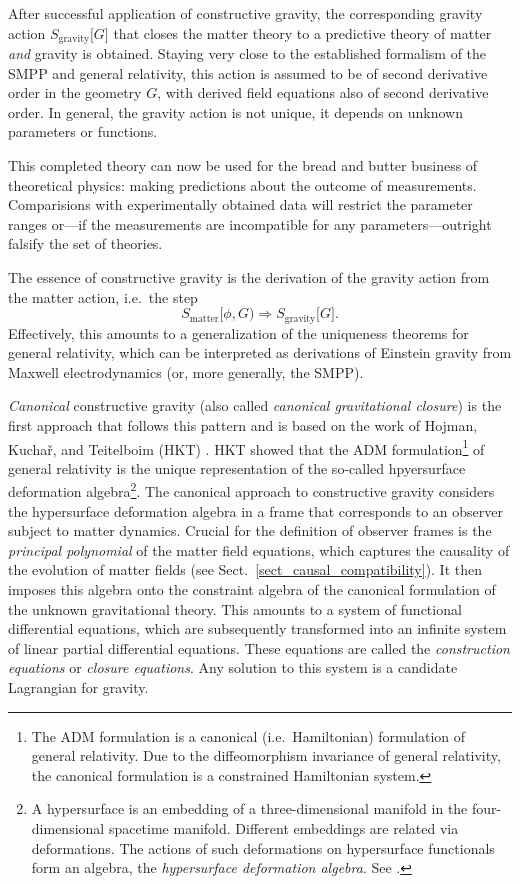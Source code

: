 After successful application of constructive gravity, the corresponding gravity action $S_\text{gravity}\lbrack G\rbrack$ that closes the matter theory to a predictive theory of matter \emph{and} gravity is obtained. Staying very close to the established formalism of the SMPP and general relativity, this action is assumed to be of second derivative order in the geometry $G$, with derived field equations also of second derivative order. In general, the gravity action is not unique, it depends on unknown parameters or functions.

This completed theory can now be used for the bread and butter business of theoretical physics: making predictions about the outcome of measurements. Comparisions with experimentally obtained data will restrict the parameter ranges or---if the measurements are incompatible for any parameters---outright falsify the set of theories.

The essence of constructive gravity is the derivation of the gravity action from the matter action, i.e.\ the step
\begin{equation*}
  S_\text{matter}\lbrack\phi,G) \Rightarrow S_\text{gravity}\lbrack G\rbrack.
\end{equation*}
Effectively, this amounts to a generalization of the uniqueness theorems for general relativity, which can be interpreted as derivations of Einstein gravity from Maxwell electrodynamics (or, more generally, the SMPP).

\emph{Canonical} constructive gravity (also called \emph{canonical gravitational closure}) \cite{Giesel_2012,Schuller_2014,Witte_2014,D_ll_2018} is the first approach that follows this pattern and is based on the work of Hojman, Kucha\v{r}, and Teitelboim (HKT) \cite{Hojman_1976}. HKT showed that the ADM formulation\footnote{The ADM formulation \cite{Arnowitt_1960} is a canonical (i.e.\ Hamiltonian) formulation of general relativity. Due to the diffeomorphism invariance of general relativity, the canonical formulation is a constrained Hamiltonian system.} of general relativity is the unique representation of the so-called hpyersurface deformation algebra\footnote{A hypersurface is an embedding of a three-dimensional manifold in the four-dimensional spacetime manifold. Different embeddings are related via deformations. The actions of such deformations on hypersurface functionals form an algebra, the \emph{hypersurface deformation algebra}. See \cite{Hojman_1976}.}. The canonical approach to constructive gravity considers the hypersurface deformation algebra in a frame that corresponds to an observer subject to matter dynamics. Crucial for the definition of observer frames is the \emph{principal polynomial} of the matter field equations, which captures the causality of the evolution of matter fields (see Sect.~\ref{sect_causal_compatibility}). It then imposes this algebra onto the constraint algebra of the canonical formulation of the unknown gravitational theory. This amounts to a system of functional differential equations, which are subsequently transformed into an infinite system of linear partial differential equations. These equations are called the \emph{construction equations} or \emph{closure equations}. Any solution to this system is a candidate Lagrangian for gravity.

